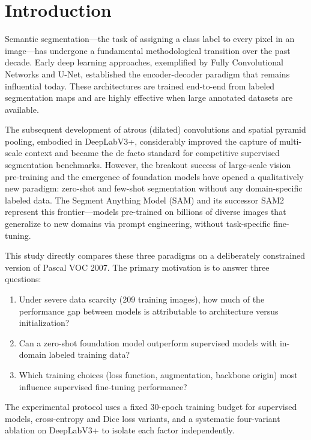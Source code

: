 \documentclass[11pt,a4paper]{article}
\begin{document}
\section{Introduction}

Semantic segmentation---the task of assigning a class label to every pixel in an image---has undergone a fundamental methodological transition over the past decade. Early deep learning approaches, exemplified by Fully Convolutional Networks and U-Net, established the encoder-decoder paradigm that remains influential today. These architectures are trained end-to-end from labeled segmentation maps and are highly effective when large annotated datasets are available.

The subsequent development of atrous (dilated) convolutions and spatial pyramid pooling, embodied in DeepLabV3+, considerably improved the capture of multi-scale context and became the de facto standard for competitive supervised segmentation benchmarks. However, the breakout success of large-scale vision pre-training and the emergence of foundation models have opened a qualitatively new paradigm: zero-shot and few-shot segmentation without any domain-specific labeled data. The Segment Anything Model (SAM) and its successor SAM2 represent this frontier---models pre-trained on billions of diverse images that generalize to new domains via prompt engineering, without task-specific fine-tuning.

This study directly compares these three paradigms on a deliberately constrained version of Pascal VOC 2007. The primary motivation is to answer three questions:
\begin{enumerate}
  \item Under severe data scarcity (209 training images), how much of the performance gap between models is attributable to architecture versus initialization?
  \item Can a zero-shot foundation model outperform supervised models with in-domain labeled training data?
  \item Which training choices (loss function, augmentation, backbone origin) most influence supervised fine-tuning performance?
\end{enumerate}

The experimental protocol uses a fixed 30-epoch training budget for supervised models, cross-entropy and Dice loss variants, and a systematic four-variant ablation on DeepLabV3+ to isolate each factor independently.
\end{document}

